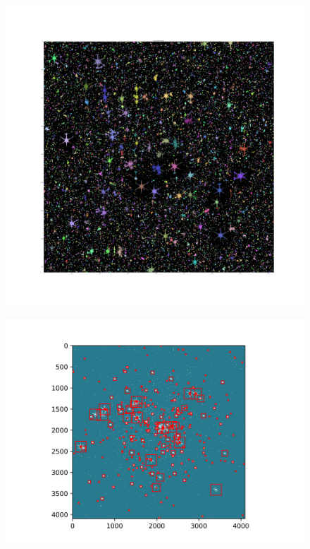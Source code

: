 \documentclass{beamer}
\begin{document}
\begin{frame}
\begin{figure}
\centering
\includegraphics[width=\textwidth,height=\textheight,keepaspectratio]{Images/ISPhotutils_32BK_4THRE_3Kernel.png}
\end{figure}
\end{frame}


\begin{frame}
\begin{figure}
\centering
\includegraphics[width=\textwidth,height=\textheight,keepaspectratio]{Images/masking.png}
\end{figure}
\end{frame}
\end{document}

